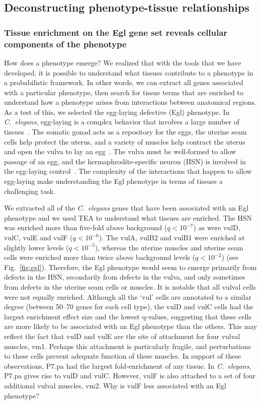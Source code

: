 \documentclass[10pt, onecolumn]{article}
\newcommand{\cel}{\emph{C.~elegans}}
\newcommand{\qval}[1]{\ensuremath{q<10^{-#1}}}
\begin{document}
\subsection*{Deconstructing phenotype-tissue relationships}
\subsubsection*{Tissue enrichment on the Egl gene set reveals cellular
components of the phenotype}
How does a phenotype emerge? We realized that with the tools that we have
developed, it is possible to understand what tissues contribute to a phenotype
in a probabilistic framework. In other words, we can extract all genes
associated with a particular phenotype, then search for tissue terms that are
enriched to understand how a phenotype arises from interactions between
anatomical regions. As a test of this, we selected the egg-laying defective
(Egl) phenotype. In \cel{}, egg-laying is a complex behavior that involves a
large number of tissues~\cite{Li1990}. The somatic gonad acts as a repository
for the eggs, the uterine seam cells help protect the uterus, and a variety of
muscles help contract the uterus and open the vulva to lay an
egg~\cite{Sulston1977}. The vulva must be well-formed to allow passage of an
egg, and the hermaphrodite-specific neuron (HSN) is involved in the egg-laying
control~\cite{Schafer2005}. The complexity of the interactions that happen to
allow egg-laying make understanding the Egl phenotype in terms of tissues a
challenging task.

We extracted all of the \cel{} genes that have been associated with an Egl
phenotype and we used TEA to understand what tissues are enriched. The HSN was
enriched more than five-fold above background (\qval{7}) as were vulD, vulC,
vulE and vulF (\qval{6}). The vulA, vulB2 and vulB1 were enriched at slightly
lower levels (\qval{5}), whereas the uterine muscles and uterine seam cells were
enriched more than twice above background levels (\qval{2}) (see
Fig.~\ref{fig:egl}). Therefore, the Egl phenotype would seem to emerge primarily
from defects in the HSN, secondarily from defects in the vulva, and only
sometimes from defects in the uterine seam cells or muscles. It is notable that
all vulval cells were not equally enriched. Although all the `vul' cells are
annotated to a similar degree (between 50--70 genes for each cell type), the
vulD and vulC cells had the largest enrichment effect size and the lowest
q-values, suggesting that these cells are more likely to be associated with an
Egl phenotype than the others. This may reflect the fact that vulD and vulE are
the site of attachment for four vulval muscles, vm1. Perhaps this attachment is
particularly fragile, and perturbations to these cells prevent adequate function
of these muscles. In support of these observations, P7.pa had the largest
fold-enrichment of any tissue. In \cel{}, P7.pa gives rise to vulD and vulC.
However, vulF is also attached to a set of four additional vulval muscles, vm2.
Why is vulF less associated with an Egl phenotype?
\end{document}
